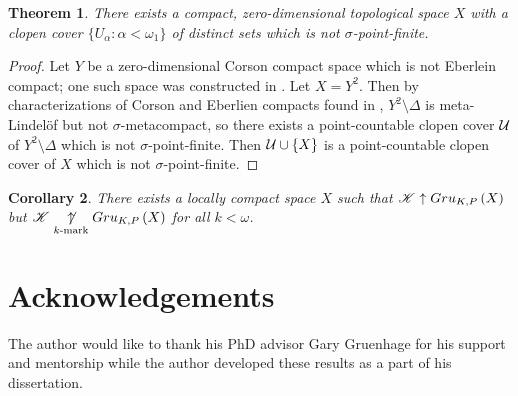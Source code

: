 \documentclass{amsart}
\newtheorem{theorem}{Theorem}[section]
\newtheorem{corollary}[theorem]{Corollary}
\theoremstyle{definition}
\begin{document}
\begin{theorem}
  There exists a compact, zero-dimensional topological space $X$
  with a clopen cover $\{U_\alpha : \alpha<\omega_1\}$ of distinct
  sets which is not $\sigma$-point-finite.
\end{theorem}

\begin{proof}
  Let $Y$ be a zero-dimensional Corson compact space which is not Eberlein
  compact; one such space was constructed in \cite{Marciszewski1991291}.
  Let $X=Y^2$.
  Then by characterizations of Corson and Eberlien compacts found in
  \cite{MR752278},
  $Y^2\setminus\Delta$ is meta-Lindel\"of but not $\sigma$-metacompact, so
  there exists a point-countable clopen cover $\mathcal{U}$ of $Y^2\setminus\Delta$
  which is not $\sigma$-point-finite. Then $\mathcal{U}\cup\{X\}$ is a point-countable
  clopen cover of $X$ which is not $\sigma$-point-finite.
\end{proof}

\begin{corollary}
  There exists a locally compact space $X$ such that $\mathscr{K}\uparrow Gru_{K,P}\left({X}\right)$
  but $\mathscr{K}\underset{k\text{-mark}}{\not\uparrow} Gru_{K,P}\left({X}\right)$ for all $k<\omega$.
\end{corollary}


\section{Acknowledgements}

The author would like to thank his PhD advisor Gary Gruenhage for his
support and mentorship while the author developed these results as a part of
his dissertation.




\end{document}
